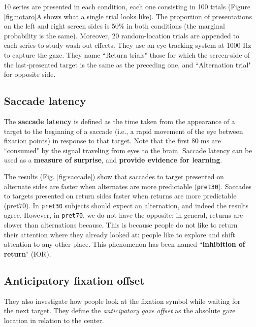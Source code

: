 10 series are presented in each condition, each one consisting in 100 trials (Figure \ref{fig:notaro}A shows what a single trial looks like).
The proportion of presentations on the left and right screen sides is 50\% in both conditions (the marginal probability is the same).
Moreover, 20 random-location trials are appended to each series to study wash-out effects. They use an eye-tracking system at 1000 Hz to capture the gaze.
They name ``Return trials" those for which the screen-side of the last-presented target is the same as the preceding one, and ``Alternation trial" for opposite side.

\subsection{Saccade latency}
The \textbf{saccade latency} is defined as the time taken from the appearance of a target to the beginning of a saccade (i.e., a rapid movement of the eye between fixation points) in response to that target. Note that the first 80 ms are ``consumed" by the signal traveling from eyes to the brain. Saccade latency can be used as a \textbf{measure of surprise}, and \textbf{provide evidence for learning}.

The results (Fig. \ref{fig:saccade}) show that saccades to target presented on alternate sides are faster when alternates are more predictable (\texttt{pret30}). Saccades to targets presented on return sides faster when returns are more predictable (pret70). In \texttt{pret30} subjects should expect an alternation, and indeed the results agree. However, in \texttt{pret70}, we do not have the opposite: in general, returns are slower than alternations because. This is because people do not like to return their attention where they already looked at: people like to explore and shift attention to any other place. This phenomenon has been named ``\textbf{inhibition of return}" (IOR).

\subsection{Anticipatory fixation offset}
They also investigate how people look at the fixation symbol while waiting for the next target.
They define the \textit{anticipatory gaze offset} as the absolute gaze location in relation to the center.


